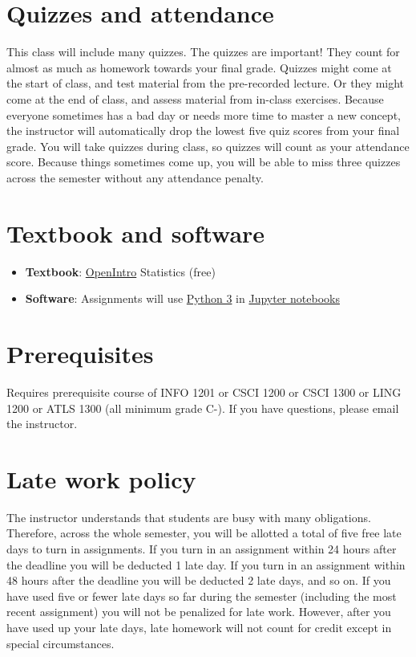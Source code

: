 \documentclass[10pt]{memoir}
\begin{document}
\section{\textbf{Quizzes and attendance}}

This class will include many quizzes. The quizzes are important! They count for almost as much as homework towards your final grade. Quizzes might come at the start of class, and test material from the pre-recorded lecture. Or they might come at the end of class, and assess material from in-class exercises. Because everyone sometimes has a bad day or needs more time to master a new concept, the instructor will automatically drop the lowest five quiz scores from your final grade. You will take quizzes during class, so quizzes will count as your attendance score. Because things sometimes come up, you will be able to miss three quizzes across the semester without any attendance penalty. 

\section{\textbf{Textbook and software }}

\begin{itemize}
\item \textbf{Textbook}: \href{https://www.abehandler.com/resources/openintro-statistics.pdf}{OpenIntro} Statistics (free)
\item \textbf{Software}: Assignments will use \href{https://www.python.org/}{Python 3} in \href{https://jupyter.org/}{Jupyter notebooks}
\end{itemize}

\section{\textbf{Prerequisites}}

Requires prerequisite course of INFO 1201 or CSCI 1200 or CSCI 1300 or LING 1200 or ATLS 1300 (all minimum grade C-). If you have questions, please email the instructor.

\section{\textbf{Late work policy}}
The instructor understands that students are busy with many obligations. Therefore, across the whole semester, you will be allotted a total of five free late days to turn in assignments. If you turn in an assignment within 24 hours after the deadline you will be deducted 1 late day. If you turn in an assignment within 48 hours after the deadline you will be deducted 2 late days, and so on. If you have used five or fewer late days so far during the semester (including the most recent assignment) you will not be penalized for late work. However, after you have used up your late days, late homework will not count for credit except in special circumstances.
\end{document}
